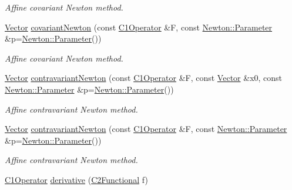 \begin{DoxyCompactItemize}
\begin{DoxyCompactList}\small\item\em Affine covariant Newton method. \end{DoxyCompactList}\item 
\hyperlink{classSpacy_1_1Vector}{Vector} \hyperlink{group__NewtonGroup_gaf1a54d96b031527304e8d7e421005a07_gaf1a54d96b031527304e8d7e421005a07}{covariant\+Newton} (const \hyperlink{group__SpacyGroup_ga87ae8cb0d7a567a4bb181e0a9f182620_ga87ae8cb0d7a567a4bb181e0a9f182620}{C1\+Operator} \&F, const \hyperlink{structSpacy_1_1Newton_1_1Parameter}{Newton\+::\+Parameter} \&p=\hyperlink{structSpacy_1_1Newton_1_1Parameter}{Newton\+::\+Parameter}())
\begin{DoxyCompactList}\small\item\em Affine covariant Newton method. \end{DoxyCompactList}\item 
\hyperlink{classSpacy_1_1Vector}{Vector} \hyperlink{group__NewtonGroup_gaa32f667c573986b2b2721ec6532fc832_gaa32f667c573986b2b2721ec6532fc832}{contravariant\+Newton} (const \hyperlink{group__SpacyGroup_ga87ae8cb0d7a567a4bb181e0a9f182620_ga87ae8cb0d7a567a4bb181e0a9f182620}{C1\+Operator} \&F, const \hyperlink{classSpacy_1_1Vector}{Vector} \&x0, const \hyperlink{structSpacy_1_1Newton_1_1Parameter}{Newton\+::\+Parameter} \&p=\hyperlink{structSpacy_1_1Newton_1_1Parameter}{Newton\+::\+Parameter}())
\begin{DoxyCompactList}\small\item\em Affine contravariant Newton method. \end{DoxyCompactList}\item 
\hyperlink{classSpacy_1_1Vector}{Vector} \hyperlink{group__NewtonGroup_gace045630c7f0c7a1a5a48d2d0807f608_gace045630c7f0c7a1a5a48d2d0807f608}{contravariant\+Newton} (const \hyperlink{group__SpacyGroup_ga87ae8cb0d7a567a4bb181e0a9f182620_ga87ae8cb0d7a567a4bb181e0a9f182620}{C1\+Operator} \&F, const \hyperlink{structSpacy_1_1Newton_1_1Parameter}{Newton\+::\+Parameter} \&p=\hyperlink{structSpacy_1_1Newton_1_1Parameter}{Newton\+::\+Parameter}())
\begin{DoxyCompactList}\small\item\em Affine contravariant Newton method. \end{DoxyCompactList}\item 
\hyperlink{group__SpacyGroup_ga87ae8cb0d7a567a4bb181e0a9f182620_ga87ae8cb0d7a567a4bb181e0a9f182620}{C1\+Operator} \hyperlink{group__SpacyGroup_ga002fe344fa6d04a6ac59a74ea25fddb6_ga002fe344fa6d04a6ac59a74ea25fddb6}{derivative} (\hyperlink{group__SpacyGroup_gaf5b89e117806134b06a1ce4629fb2b65_gaf5b89e117806134b06a1ce4629fb2b65}{C2\+Functional} f)

\end{DoxyCompactItemize}
